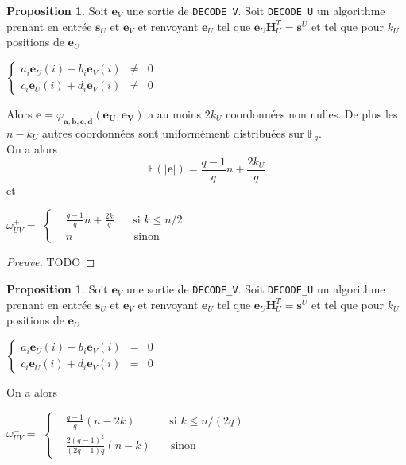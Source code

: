 \documentclass[12pt]{article}
\theoremstyle{definition}
\newtheorem{propo}[thm]{Proposition}
\newcommand{\F}{\mathbb{F}}
\begin{document}
\begin{propo} Soit $\mathbf{e}_V$ une sortie de \verb|DECODE_V|. Soit \verb|DECODE_U| un algorithme prenant en entrée $\mathbf{s}_U$ et $\mathbf{e}_V$ et renvoyant $\mathbf{e}_U$ tel que $\mathbf{e}_U\mathbf{H}_U^T = \mathbf{s}^U$ et tel que pour $k_U$ positions de $\mathbf{e}_U$ 
\begin{center}
$\left \{
\begin{array}{rcl}
a_i\mathbf{e}_U(i) + b_i\mathbf{e}_V(i) &\neq& 0 \\
c_i\mathbf{e}_U(i) + d_i\mathbf{e}_V(i) &\neq& 0
\end{array}
\right.$
\end{center}
Alors $\mathbf{e} = \varphi_{\mathbf{a},\mathbf{b},\mathbf{c},\mathbf{d}}(\mathbf{e_U},\mathbf{e_V})$ a au moins $2k_U$ coordonnées non nulles. De plus les $n-k_U$ autres coordonnées sont uniformément distribuées sur $\F_q$. \\
On a alors 
$$ \mathbb{E}(|\mathbf{e}|) = \frac{q-1}{q}n + \frac{2k_U}{q} $$
et 
\begin{center}
$\omega^+_{UV} = $
$\left \{
\begin{array}{rcl}
&\frac{q-1}{q}n + \frac{2k}{q} & \;\; \text{ si } k \leq n/2 \\
&n & \quad \text{sinon}
\end{array}
\right.$
\end{center}
\end{propo}

\begin{proof}[Preuve]
TODO
\end{proof}


\begin{propo} Soit $\mathbf{e}_V$ une sortie de \verb|DECODE_V|. Soit \verb|DECODE_U| un algorithme prenant en entrée $\mathbf{s}_U$ et $\mathbf{e}_V$ et renvoyant $\mathbf{e}_U$ tel que $\mathbf{e}_U\mathbf{H}_U^T = \mathbf{s}^U$ et tel que pour $k_U$ positions de $\mathbf{e}_U$ 
\begin{center}
$\left \{
\begin{array}{rcl}
a_i\mathbf{e}_U(i) + b_i\mathbf{e}_V(i) &=& 0 \\
c_i\mathbf{e}_U(i) + d_i\mathbf{e}_V(i) &=& 0
\end{array}
\right.$
\end{center}
On a alors
\begin{center}
$\omega^-_{UV} = $
$\left \{
\begin{array}{rcl}
&\frac{q-1}{q}(n-2k) & \;\; \text{ si } k \leq n/(2q) \\
&\frac{2(q-1)^2}{(2q-1)q}(n-k) & \quad \text{sinon}
\end{array}
\right.$
\end{center}
\end{propo}
\end{document}
